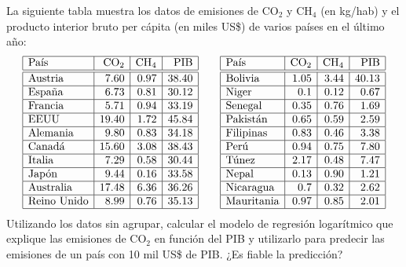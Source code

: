 {La siguiente tabla muestra los datos de emisiones de CO$_2$ y CH$_4$ (en kg/hab) y el producto interior bruto per cápita (en miles US\$) de varios países en el último año:
\[
\begin{array}{|l|r|r|r|}
\hline
\mbox{País} & \mbox{CO}_2 & \mbox{CH}_4 & \mbox{PIB}\\
\hline\hline
\mbox{Austria}     & 7.60 & 0.97 & 38.40\\ \hline
\mbox{España}      & 6.73 & 0.81	& 30.12\\ \hline
\mbox{Francia}     & 5.71 & 0.94	& 33.19\\ \hline
\mbox{EEUU}        &19.40 & 1.72	&	45.84\\ \hline
\mbox{Alemania}    & 9.80 & 0.83	& 34.18\\ \hline
\mbox{Canadá}      &15.60 & 3.08	& 38.43\\ \hline
\mbox{Italia}      & 7.29 & 0.58	& 30.44\\ \hline
\mbox{Japón}       &	9.44 & 0.16	& 33.58\\ \hline
\mbox{Australia}   &17.48 & 6.36	& 36.26\\ \hline
\mbox{Reino Unido} & 8.99 & 0.76	& 35.13\\ \hline
\end{array}
\qquad
\begin{array}{|l|r|r|r|}
\hline
\mbox{País} & \mbox{CO}_2 & \mbox{CH}_4 & \mbox{PIB}\\
\hline\hline
\mbox{Bolivia}     & 1.05 & 3.44	& 40.13\\ \hline
\mbox{Niger}       &	0.1	 & 0.12	&	 0.67\\ \hline
\mbox{Senegal}     &	0.35 & 0.76 &  1.69\\ \hline
\mbox{Pakistán}    & 0.65 & 0.59	&  2.59\\ \hline
\mbox{Filipinas}   &	0.83 & 0.46	&  3.38\\ \hline
\mbox{Perú}        & 0.94 & 0.75	&  7.80\\ \hline
\mbox{Túnez}      & 2.17 & 0.48	&  7.47\\ \hline
\mbox{Nepal}       & 0.13 & 0.90	&  1.21\\ \hline
\mbox{Nicaragua}   & 0.7	 & 0.32	&  2.62\\ \hline
\mbox{Mauritania}  & 0.97 & 0.85	&  2.01\\ \hline
\end{array}
\]
Utilizando los datos sin agrupar, calcular el modelo de regresión logarítmico que explique las emisiones de CO$_2$ en función del PIB y utilizarlo para predecir las emisiones de un país con 10 mil US\$ de PIB.
¿Es fiable la predicción?
}
{}
{}


